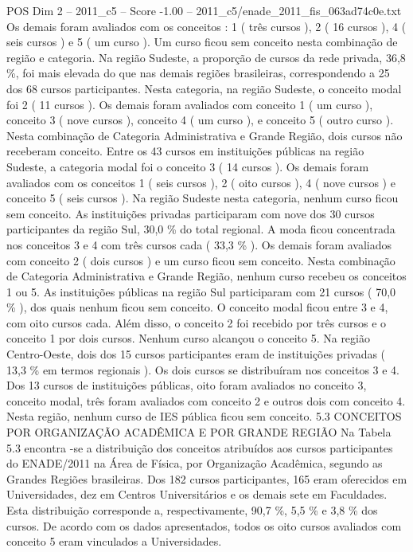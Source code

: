 \begin{textsample}{POS Dim 2 – 2011\_c5 – Score -1.00 – 2011\_c5/enade\_2011\_fis\_063ad74c0e.txt}
Os demais foram avaliados com os conceitos : 1 ( três cursos ), 2 ( 16 cursos ), 4 ( seis cursos ) e 5 ( um curso ).
Um curso ficou sem conceito nesta combinação de região e categoria.
Na região Sudeste, a proporção de cursos da rede privada, 36,8 \%, foi mais elevada do que nas demais regiões brasileiras, correspondendo a 25 dos 68 cursos participantes.
Nesta categoria, na região Sudeste, o conceito modal foi 2 ( 11 cursos ).
Os demais foram avaliados com conceito 1 ( um curso ), conceito 3 ( nove cursos ), conceito 4 ( um curso ), e conceito 5 ( outro curso ).
Nesta combinação de Categoria Administrativa e Grande Região, dois cursos não receberam conceito.
Entre os 43 cursos em instituições públicas na região Sudeste, a categoria modal foi o conceito 3 ( 14 cursos ).
Os demais foram avaliados com os conceitos 1 ( seis cursos ), 2 ( oito cursos ), 4 ( nove cursos ) e conceito 5 ( seis cursos ).
Na região Sudeste nesta categoria, nenhum curso ficou sem conceito.
As instituições privadas participaram com nove dos 30 cursos participantes da região Sul, 30,0 \% do total regional.
A moda ficou concentrada nos conceitos 3 e 4 com três cursos cada ( 33,3 \% ).
Os demais foram avaliados com conceito 2 ( dois cursos ) e um curso ficou sem conceito.
Nesta combinação de Categoria Administrativa e Grande Região, nenhum curso recebeu os conceitos 1 ou 5.
As instituições públicas na região Sul participaram com 21 cursos ( 70,0 \% ), dos quais nenhum ficou sem conceito.
O conceito modal ficou entre 3 e 4, com oito cursos cada.
Além disso, o conceito 2 foi recebido por três cursos e o conceito 1 por dois cursos.
Nenhum curso alcançou o conceito 5.
Na região Centro-Oeste, dois dos 15 cursos participantes eram de instituições privadas ( 13,3 \% em termos regionais ).
Os dois cursos se distribuíram nos conceitos 3 e 4.
Dos 13 cursos de instituições públicas, oito foram avaliados no conceito 3, conceito modal, três foram avaliados com conceito 2 e outros dois com conceito 4.
Nesta região, nenhum curso de IES pública ficou sem conceito. 5.3 CONCEITOS POR ORGANIZAÇÃO ACADÊMICA E POR GRANDE REGIÃO Na Tabela 5.3 encontra -se a distribuição dos conceitos atribuídos aos cursos participantes do ENADE/2011 na Área de Física, por Organização Acadêmica, segundo as Grandes Regiões brasileiras.
Dos 182 cursos participantes, 165 eram oferecidos em Universidades, dez em Centros Universitários e os demais sete em Faculdades.
Esta distribuição corresponde a, respectivamente, 90,7 \%, 5,5 \% e 3,8 \% dos cursos.
De acordo com os dados apresentados, todos os oito cursos avaliados com conceito 5 eram vinculados a Universidades.

\end{textsample}
